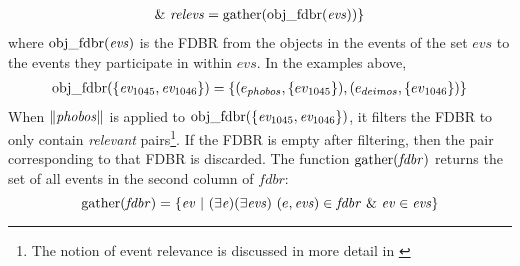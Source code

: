 \documentclass[../main.tex]{subfiles}
\begin{document}
\begin{refsection}
\begin{multline*}
	\&\ \mathit{relevs} = \mathrm{gather}({\mathrm{obj\_fdbr}(\mathit{evs})}) \}
\end{multline*}
where $\mathrm{obj\_fdbr}(\mathit{evs})$ is the FDBR from the objects in the events of the set $\mathit{evs}$ to the events they participate in within $\mathit{evs}$.  In the examples above,
\begin{multline*}
	\mathrm{obj\_fdbr}(\mathit{\{ev_{\mathrm{1045}}, ev_{\mathrm{1046}}\}}) = \{(e_{phobos}, \{ev_{\mathrm{1045}}\}), (e_{deimos}, \{ev_{\mathrm{1046}}\}) \}
\end{multline*}
When $\lVert \mathit{\mathit{phobos}} \rVert$ is applied to $\mathrm{obj\_fdbr}(\mathit{\{ev_{\mathrm{1045}}, ev_{\mathrm{1046}}\}})$, it filters the FDBR
to only contain {\em relevant} pairs\footnote{The notion of event relevance is discussed in more detail in \cite{peelar2016accommodating}}.  If the FDBR is empty after filtering, then the pair corresponding to that FDBR is discarded.
The function $\mathrm{gather}({\mathit{fdbr}})$ returns the set of all events in the second column of $\mathit{fdbr}$:
\begin{equation*}
	\gatherevs{\mathit{fdbr}} = \{ \mathit{ev}\ |\ (\exists \mathit{e})(\exists \mathit{evs})\ (e, \mathit{evs}) \in \mathit{fdbr}\ \&\ \mathit{ev} \in \mathit{evs} \}
\end{equation*}


\end{refsection}
\end{document}
